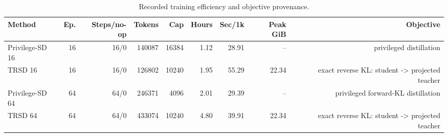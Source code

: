 \begin{table}[t]
\centering
\small
\caption{Recorded training efficiency and objective provenance.}
\label{tab:trsd-train-efficiency}
\begin{tabular}{lrrrrrrrr}
\toprule
Method & Ep. & Steps/no-op & Tokens & Cap & Hours & Sec/1k & Peak GiB & Objective \\
\midrule
Privilege-SD 16 & 16 & 16/0 & 140087 & 16384 & 1.12 & 28.91 & -- & privileged distillation \\
TRSD 16 & 16 & 16/0 & 126802 & 10240 & 1.95 & 55.29 & 22.34 & exact reverse KL: student -> projected teacher \\
Privilege-SD 64 & 64 & 64/0 & 246371 & 4096 & 2.01 & 29.39 & -- & privileged forward-KL distillation \\
TRSD 64 & 64 & 64/0 & 433074 & 10240 & 4.80 & 39.91 & 22.34 & exact reverse KL: student -> projected teacher \\
\bottomrule
\end{tabular}
\end{table}
